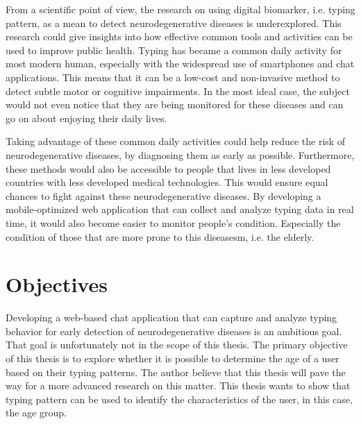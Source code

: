 From a scientific point of view, the research on using digital biomarker, i.e. typing pattern, as a mean to detect neurodegenerative diseases is underexplored.
This research could give insights into how effective common tools and activities can be used to improve public health.
Typing has became a common daily activity for most modern human, especially with the widespread use of smartphones and chat applications.
This means that it can be a low-cost and non-invasive method to detect subtle motor or cognitive impairments.
In the most ideal case, the subject would not even notice that they are being monitored for these diseases and can go on about enjoying their daily lives.

Taking advantage of these common daily activities could help reduce the risk of neurodegenerative diseases, by diagnosing them as early as possible.
Furthermore, these methods would also be accessible to people that lives in less developed countries with less developed medical technologies.
This would ensure equal chances to fight against these neurodegenerative diseases.
By developing a mobile-optimized web application that can collect and analyze typing data in real time, it would also become easier to monitor people's condition.
Especially the condition of those that are more prone to this diseasesm, i.e. the elderly.

\section{Objectives}


Developing a web-based chat application that can capture and analyze typing behavior for early detection of neurodegenerative diseases is an ambitious goal.
That goal is unfortunately not in the scope of this thesis.
The primary objective of this thesis is to explore whether it is possible to determine the age of a user based on their typing patterns.
The author believe that this thesis will pave the way for a more advanced research on this matter.
This thesis wants to show that typing pattern can be used to identify the characteristics of the user, in this case, the age group.

